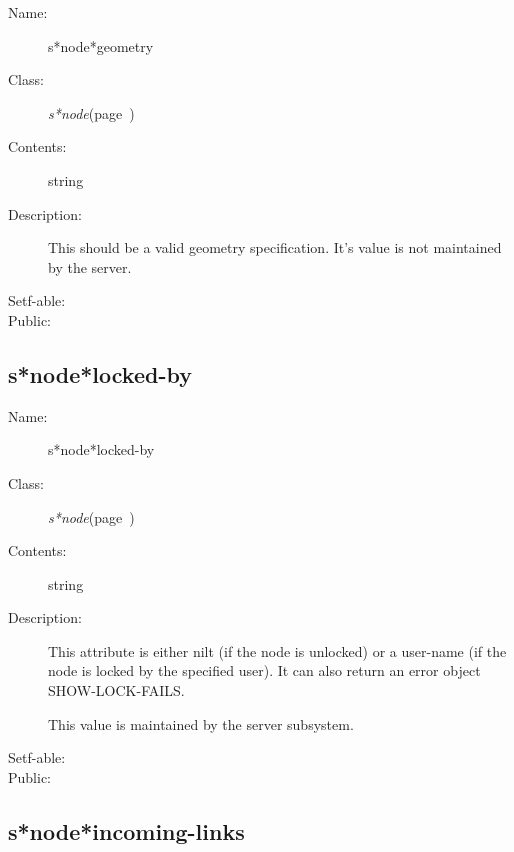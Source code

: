 \begin{description}

\item [Name:]  s*node*geometry

\item [Class:] {\sl s*node}\hfill(page~\pageref{s*node})

\item [Contents:] string

\item [Description:]
This should be a valid geometry
specification.  It's value is not
maintained by the server.

\item [Setf-able:]


\item [Public:]



\end{description}
\horizontalline

\subsection{s*node*locked-by}
\label{s*node*locked-by}

\begin{description}

\item [Name:]  s*node*locked-by

\item [Class:] {\sl s*node}\hfill(page~\pageref{s*node})

\item [Contents:] string

\item [Description:]

This attribute is either nilt (if the node is
unlocked) or a user-name (if the node is locked by
the specified user). It can also return an error
object SHOW-LOCK-FAILS.

This value is maintained by the server
subsystem.

\item [Setf-able:]


\item [Public:]



\end{description}
\horizontalline

\subsection{s*node*incoming-links}
\label{s*node*incoming-links}

